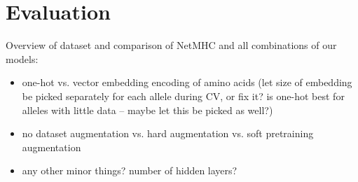 \section*{Evaluation}
Overview of dataset and comparison of NetMHC and all combinations of our models:
\begin{itemize}
\item one-hot vs. vector embedding encoding of amino acids (let size of embedding be picked separately for each allele during CV, or fix it? is one-hot best for alleles with little data -- maybe let this be picked as well?)
\item no dataset augmentation vs. hard augmentation vs. soft pretraining augmentation
\item any other minor things? number of hidden layers?
\end{itemize}

